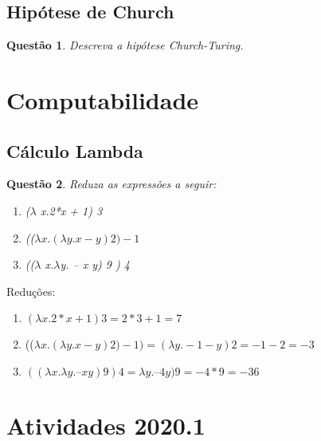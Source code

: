 \documentclass{article}
\newtheorem{problem}{Questão}
\begin{document}
    \subsection{Hipótese de Church}
        \begin{problem}
              Descreva a hipótese Church-Turing.
        \end{problem}
        \begin{solution}
        
    \end{solution}
\section{Computabilidade}

    \subsection{Cálculo Lambda}
    \begin{problem}
        Reduza as expressões a seguir:
        \begin{enumerate}[label=(\alph*)]
            \item ($\lambda$ x.2*x + 1) 3
            \item (($\lambda x.(\lambda y.x-y) 2 ) -1$
            \item (($\lambda$ x.$\lambda$y. – x y) 9 ) 4
        \end{enumerate}
    \end{problem}
    
    \begin{solution} Reduções:
        \begin{enumerate}[label=(\alph*)]
            \item $(\lambda x. 2*x + 1) 3 = 2*3 + 1 = 7$
            \item (($\lambda x.(\lambda y.x-y) 2 ) -1) = (\lambda y.-1-y) 2  = -1-2 = -3$
            \item $((\lambda x. \lambda y. – x y) 9 ) 4 =  \lambda y. – 4 y) 9 = -4*9 = -36 $
        \end{enumerate}
    \end{solution}

\section{Atividades 2020.1}
\end{document}

